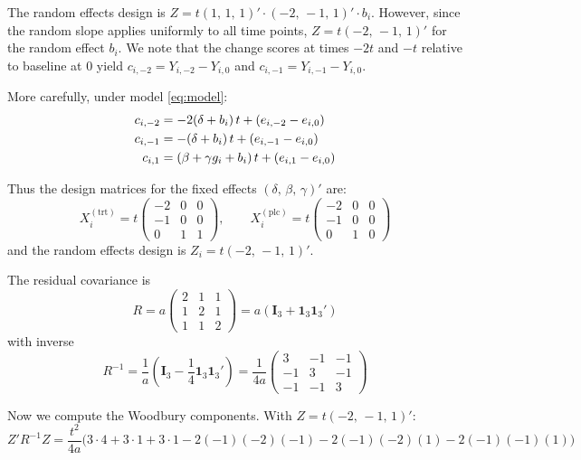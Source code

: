\documentclass[
]{article}
\begin{document}
The random effects design is \(Z = t(1,\, 1,\, 1)' \cdot
(-2,\, -1,\, 1)' \cdot b_i\). However, since the random slope applies
uniformly to all time points, \(Z = t(-2,\, -1,
\, 1)'\) for the random effect \(b_i\). We note that the change scores
at times \(-2t\) and \(-t\) relative to baseline at \(0\) yield
\(c_{i,-2} = Y_{i,-2} - Y_{i,0}\) and \(c_{i,-1} = Y_{i,-1} - Y_{i,0}\).

More carefully, under model \eqref{eq:model}: \begin{align}
  c_{i,-2} &= -2(\delta + b_i)\,t + (e_{i,-2} - e_{i,0})
    \notag \\
  c_{i,-1} &= -(\delta + b_i)\,t + (e_{i,-1} - e_{i,0})
    \notag \\
  c_{i,1}  &= (\beta + \gamma g_i + b_i)\,t
    + (e_{i,1} - e_{i,0})
  \label{eq:c_r2}
\end{align}

Thus the design matrices for the fixed effects
\((\delta,\, \beta,\, \gamma)'\) are: \[
  X_i^{(\text{trt})} = t\begin{pmatrix}
    -2 & 0 & 0 \\ -1 & 0 & 0 \\ 0 & 1 & 1
  \end{pmatrix}, \qquad
  X_i^{(\text{plc})} = t\begin{pmatrix}
    -2 & 0 & 0 \\ -1 & 0 & 0 \\ 0 & 1 & 0
  \end{pmatrix}
\] and the random effects design is \(Z_i = t(-2,\, -1,\, 1)'\).

The residual covariance is \begin{equation}
  R = a\begin{pmatrix}
    2 & 1 & 1 \\ 1 & 2 & 1 \\ 1 & 1 & 2
  \end{pmatrix}
  = a(\mathbf{I}_3 + \mathbf{1}_3\mathbf{1}_3')
\end{equation} with inverse \begin{equation}
  R^{-1} = \frac{1}{a}\left(\mathbf{I}_3
    - \frac{1}{4}\mathbf{1}_3\mathbf{1}_3'\right)
  = \frac{1}{4a}\begin{pmatrix}
    3 & -1 & -1 \\ -1 & 3 & -1 \\ -1 & -1 & 3
  \end{pmatrix}
\end{equation}

Now we compute the Woodbury components. With \(Z = t(-2,\, -1,\, 1)'\):
\begin{equation}
  Z'R^{-1}Z = \frac{t^2}{4a}\bigl(
    3 \cdot 4 + 3 \cdot 1 + 3 \cdot 1
    - 2(-1)(-2)(-1) - 2(-1)(-2)(1)
    - 2(-1)(-1)(1)\bigr)
\end{equation}
\end{document}
